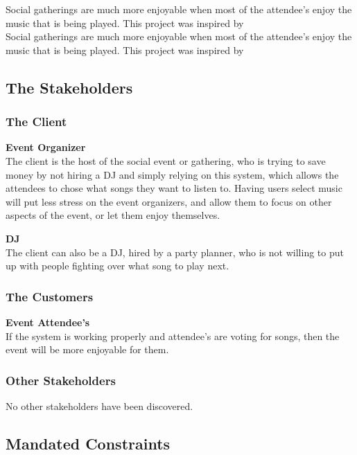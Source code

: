 \documentclass[12pt, titlepage]{article}
\begin{document}
Social gatherings are much more enjoyable when most of the attendee's enjoy
the music that is being played. This project was inspired by \\

Social gatherings are much more enjoyable when most of the attendee's enjoy
the music that is being played. This project was inspired by

\subsection{The Stakeholders}

\subsubsection{The Client}

\textbf{Event Organizer}\\
The client is the host of the social event or gathering, who is trying to save
money by not hiring a DJ and simply relying on this system, which allows the
attendees to chose what songs they want to listen to. Having users select music
will put less stress on the event organizers, and allow them to focus on other
aspects of the event, or let them enjoy themselves.

\textbf{DJ}\\
The client can also be a DJ, hired by a party planner, who is not willing to put
up with people fighting over what song to play next.

\subsubsection{The Customers}

\textbf{Event Attendee's}\\
If the system is working properly and attendee's are voting for songs, then
the event will be more enjoyable for them.

\subsubsection{Other Stakeholders}

No other stakeholders have been discovered.

\subsection{Mandated Constraints}
\end{document}

